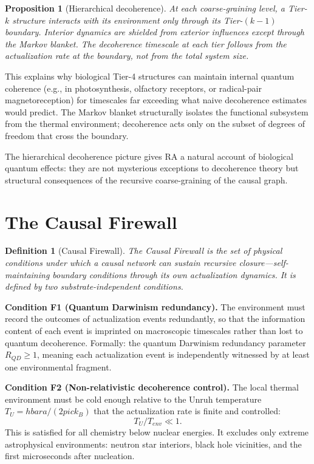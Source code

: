 \documentclass[11pt]{article}
\DeclareRobustCommand{\hbar}{\ensuremath{\hslash}}
\def\hbar{hbar}%
\def\pi{pi}%
\def\mathrm#1{#1}%
\def\frac#1#2{#1/#2}%
\newtheorem{definition}{Definition}
\newtheorem{proposition}{Proposition}
\begin{document}
\begin{proposition}[Hierarchical decoherence]
\label{prop:hierarchical_decoherence}
At each coarse-graining level, a Tier-$k$ structure interacts with its environment only through its Tier-$(k-1)$ boundary. Interior dynamics are shielded from exterior influences except through the Markov blanket. The decoherence timescale at each tier follows from the actualization rate at the boundary, not from the total system size.
\end{proposition}

This explains why biological Tier-4 structures can maintain internal quantum coherence (e.g., in photosynthesis, olfactory receptors, or radical-pair magnetoreception) for timescales far exceeding what naive decoherence estimates would predict. The Markov blanket structurally isolates the functional subsystem from the thermal environment; decoherence acts only on the subset of degrees of freedom that cross the boundary.

The hierarchical decoherence picture gives RA a natural account of biological quantum effects: they are not mysterious exceptions to decoherence theory but structural consequences of the recursive coarse-graining of the causal graph.

\section{The Causal Firewall}
\label{sec:firewall}

\begin{definition}[Causal Firewall]
The Causal Firewall is the set of physical conditions under which a causal network can sustain recursive closure---self-maintaining boundary conditions through its own actualization dynamics. It is defined by two substrate-independent conditions.
\end{definition}

\textbf{Condition F1 (Quantum Darwinism redundancy).} The environment must record the outcomes of actualization events redundantly, so that the information content of each event is imprinted on macroscopic timescales rather than lost to quantum decoherence. Formally: the quantum Darwinism redundancy parameter $R_{\mathrm{QD}}\ge 1$, meaning each actualization event is independently witnessed by at least one environmental fragment.

\textbf{Condition F2 (Non-relativistic decoherence control).} The local thermal environment must be cold enough relative to the Unruh temperature $T_U=\hbar a/(2\pi c k_B)$ that the actualization rate is finite and controlled:
\begin{equation}
\frac{T_U}{T_{\mathrm{env}}} \ll 1.
\label{eq:f2}
\end{equation}
This is satisfied for all chemistry below nuclear energies. It excludes only extreme astrophysical environments: neutron star interiors, black hole vicinities, and the first microseconds after nucleation.
\end{document}
